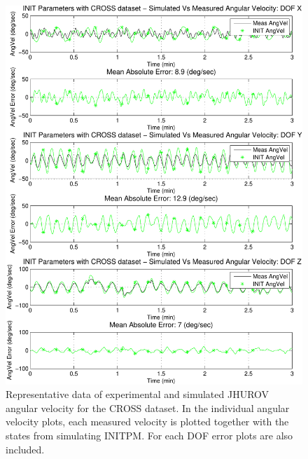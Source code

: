 \begin{center}
\begin{figure}[htbp]
  \begin{center}
    \includegraphics[width=5.5in]{./chUV_AID/images/crossINIT_vel}
  \end{center}
  \caption{ Representative data of experimental and simulated
    \ac{JHUROV} angular velocity for the \ac{CROSS} dataset. In the
    individual angular velocity plots, each measured velocity is
    plotted together with the states from simulating \ac{INITPM}.  For
    each \ac{DOF} error plots are also included. 
}
  \label{chUV_AID.fig.SO3_INIT_vel}
\end{figure}
\end{center}


